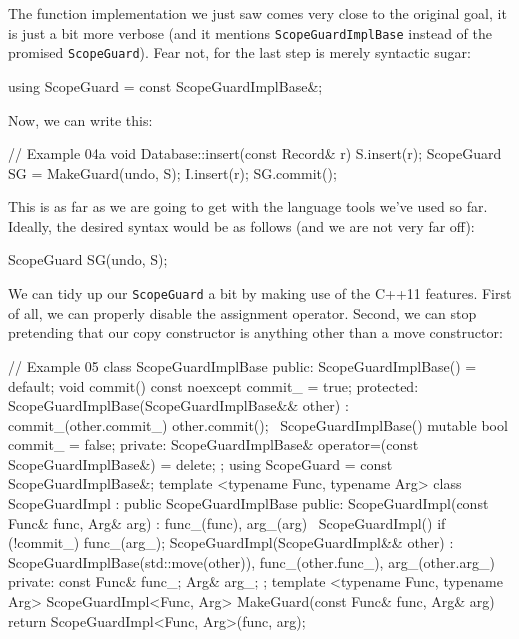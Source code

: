 The function implementation we just saw comes very close to the original goal, it is just a bit more verbose (and it mentions \texttt{ScopeGuardImplBase} instead of the promised \texttt{ScopeGuard}). Fear not, for the last step is merely syntactic sugar:

\begin{code}
using ScopeGuard = const ScopeGuardImplBase&;
\end{code}

Now, we can write this:

\begin{code}
// Example 04a
void Database::insert(const Record& r) {
  S.insert(r);
  ScopeGuard SG = MakeGuard(undo, S);
  I.insert(r);
  SG.commit();
}
\end{code}

This is as far as we are going to get with the language tools we've used so far. Ideally, the desired syntax would be as follows (and we are not very far off):

\begin{code}
ScopeGuard SG(undo, S);
\end{code}

We can tidy up our \texttt{ScopeGuard} a bit by making use of the C++11 features. First of all, we can properly disable the assignment operator. Second, we can stop pretending that our copy constructor is anything other than a move constructor:

\begin{code}
// Example 05
class ScopeGuardImplBase {
  public:
  ScopeGuardImplBase() = default;
  void commit() const noexcept { commit_ = true; }
  protected:
  ScopeGuardImplBase(ScopeGuardImplBase&& other) :
    commit_(other.commit_) { other.commit(); }
  ~ScopeGuardImplBase() {}
  mutable bool commit_ = false;
  private:
  ScopeGuardImplBase& operator=(const ScopeGuardImplBase&)
    = delete;
};
using ScopeGuard = const ScopeGuardImplBase&;
template <typename Func, typename Arg>
class ScopeGuardImpl : public ScopeGuardImplBase {
  public:
  ScopeGuardImpl(const Func& func, Arg& arg) :
    func_(func), arg_(arg) {}
  ~ScopeGuardImpl() { if (!commit_) func_(arg_); }
  ScopeGuardImpl(ScopeGuardImpl&& other) :
    ScopeGuardImplBase(std::move(other)),
    func_(other.func_),
    arg_(other.arg_) {}
  private:
  const Func& func_;
  Arg& arg_;
};
template <typename Func, typename Arg>
ScopeGuardImpl<Func, Arg>
MakeGuard(const Func& func, Arg& arg) {
  return ScopeGuardImpl<Func, Arg>(func, arg);
}
\end{code}

